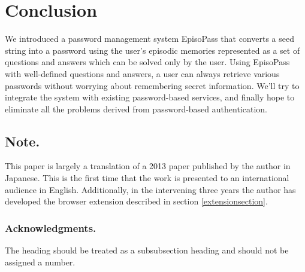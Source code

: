 \documentclass[runningheads,a4paper]{llncs}
\begin{document}
\section{Conclusion}

We introduced a password management system EpisoPass
that converts a seed string into a password using the user's
episodic memories represented as a set of questions and answers
which can be solved only by the user.
%
Using EpisoPass with well-defined questions and answers,
a user can always retrieve various passwords without worrying about
remembering secret information.
%
We'll try to integrate the system with existing password-based
services, and finally hope to eliminate all the problems
derived from password-based authentication.

%
%

\subsection*{Note.}

This paper is largely a translation of a 2013 paper published by the
author in Japanese\cite{WISS2013}. This is the first time that the
work is presented to an international audience in English.
Additionally, in the intervening three years the author has
developed the browser extension described in section \ref{extensionsection}.



\subsubsection*{Acknowledgments.} The heading should be treated as a
subsubsection heading and should not be assigned a number.



\end{document}
